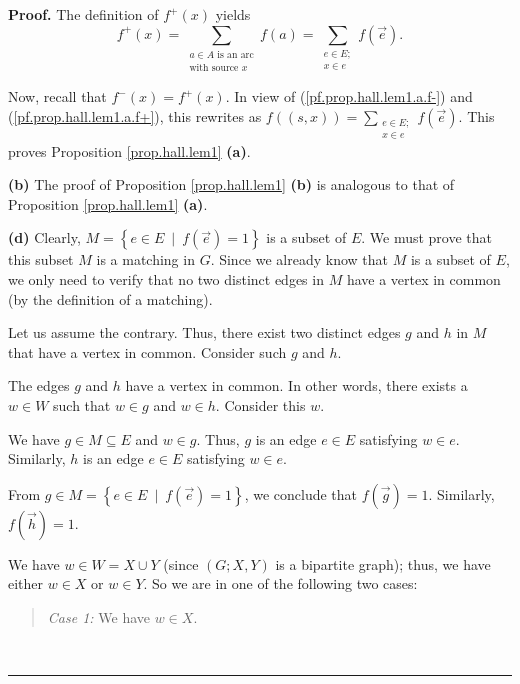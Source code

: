 \documentclass[numbers=enddot,12pt,final,onecolumn,notitlepage]{scrartcl}%
\theoremstyle{definition}
\newenvironment{statement}{\begin{quote}}{\end{quote}}
\newenvironment{proof}[1][Proof]{\noindent\textbf{#1.} }{\ \rule{0.5em}{0.5em}}
\let\sumnonlimits\sum
\renewcommand{\sum}{\sumnonlimits\limits}
\begin{document}
\begin{proof}
The definition of $f^{+}\left(  x\right)  $ yields%
\begin{equation}
f^{+}\left(  x\right)  =\sum_{\substack{a\in A\text{ is an arc}\\\text{with
source }x}}f\left(  a\right)  =\sum_{\substack{e\in E;\\x\in e}}f\left(
\overrightarrow{e}\right)  . \label{pf.prop.hall.lem1.a.f+}%
\end{equation}


Now, recall that $f^{-}\left(  x\right)  =f^{+}\left(  x\right)  $. In view of
(\ref{pf.prop.hall.lem1.a.f-}) and (\ref{pf.prop.hall.lem1.a.f+}), this
rewrites as $f\left(  \left(  s,x\right)  \right)  =\sum_{\substack{e\in
E;\\x\in e}}f\left(  \overrightarrow{e}\right)  $. This proves Proposition
\ref{prop.hall.lem1} \textbf{(a)}.

\textbf{(b)} The proof of Proposition \ref{prop.hall.lem1} \textbf{(b)} is
analogous to that of Proposition \ref{prop.hall.lem1} \textbf{(a)}.

\textbf{(d)} Clearly, $M=\left\{  e\in E\ \mid\ f\left(  \overrightarrow{e}%
\right)  =1\right\}  $ is a subset of $E$. We must prove that this subset $M$
is a matching in $G$. Since we already know that $M$ is a subset of $E$, we
only need to verify that no two distinct edges in $M$ have a vertex in common
(by the definition of a matching).

Let us assume the contrary. Thus, there exist two distinct edges $g$ and $h$
in $M$ that have a vertex in common. Consider such $g$ and $h$.

The edges $g$ and $h$ have a vertex in common. In other words, there exists a
$w\in W$ such that $w\in g$ and $w\in h$. Consider this $w$.

We have $g\in M\subseteq E$ and $w\in g$. Thus, $g$ is an edge $e\in E$
satisfying $w\in e$. Similarly, $h$ is an edge $e\in E$ satisfying $w\in e$.

From $g\in M=\left\{  e\in E\ \mid\ f\left(  \overrightarrow{e}\right)
=1\right\}  $, we conclude that $f\left(  \overrightarrow{g}\right)  =1$.
Similarly, $f\left(  \overrightarrow{h}\right)  =1$.

We have $w\in W=X\cup Y$ (since $\left(  G;X,Y\right)  $ is a bipartite
graph); thus, we have either $w\in X$ or $w\in Y$. So we are in one of the
following two cases:

\begin{statement}
\textit{Case 1:} We have $w\in X$.
\end{statement}


\end{proof}
\end{document}

